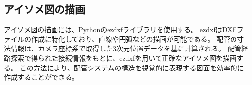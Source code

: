 \subsection{アイソメ図の描画} 
アイソメ図の描画には、Pythonのezdxfライブラリを使用する。
ezdxfはDXFファイルの作成に特化しており、直線や円弧などの描画が可能である。
配管の寸法情報は、カメラ座標系で取得した3次元位置データを基に計算される。
配管経路探索で得られた接続情報をもとに、ezdxfを用いて正確なアイソメ図を描画する。
この方法により、配管システムの構造を視覚的に表現する図面を効率的に作成することができる。










